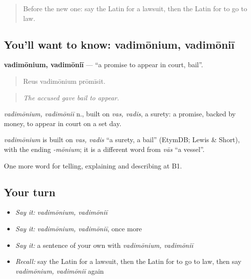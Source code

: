 \begin{quote}
Before the new one: say the Latin for a lawsuit, then the Latin for to go to law.
\end{quote}

\subsection*{You'll want to know: vadimōnium, vadimōniī}
\textbf{vadimōnium, vadimōniī} — \textquotedblleft{}a promise to appear in court, bail\textquotedblright{}.

\begin{quote}
Reus vadimōnium prōmīsit.
\end{quote}

\begin{quote}
\emph{The accused gave bail to appear.}
\end{quote}

\emph{vadimōnium, vadimōniī} n., built on \emph{vas, vadis}, a surety: a promise, backed by money, to appear in court on a set day.

\begin{cousinweb}
\emph{vadimōnium} is built on \emph{vas, vadis} \textquotedblleft{}a surety, a bail\textquotedblright{} (EtymDB; Lewis \& Short), with the ending \emph{-mōnium}; it is a different word from \emph{vās} \textquotedblleft{}a vessel\textquotedblright{}.
\end{cousinweb}

\begin{grammarlens}[title={What you've built}]
One more word for telling, explaining and describing at B1.
\end{grammarlens}

\subsection*{Your turn}
\begin{itemize}
\raggedright
  \item \emph{Say it:} \emph{vadimōnium, vadimōniī}
  \item \emph{Say it:} \emph{vadimōnium, vadimōniī}, once more
  \item \emph{Say it:} a sentence of your own with \emph{vadimōnium, vadimōniī}
  \item \emph{Recall:} say the Latin for a lawsuit, then the Latin for to go to law, then say \emph{vadimōnium, vadimōniī} again
\end{itemize}

